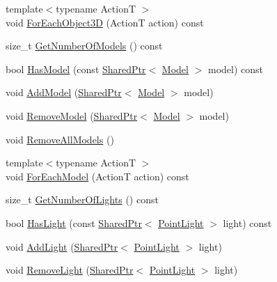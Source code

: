 \begin{DoxyCompactItemize}
\item 
{\footnotesize template$<$typename ActionT $>$ }\\void \hyperlink{classmage_1_1_world_aeaf99d59687121c072d483a98a726eff}{For\+Each\+Object3D} (ActionT action) const
\item 
size\+\_\+t \hyperlink{classmage_1_1_world_a6e04fdde74a2616746cdafd12537c4a7}{Get\+Number\+Of\+Models} () const
\item 
bool \hyperlink{classmage_1_1_world_a821d420241b2a94502b20e24595490df}{Has\+Model} (const \hyperlink{namespacemage_a1e01ae66713838a7a67d30e44c67703e}{Shared\+Ptr}$<$ \hyperlink{classmage_1_1_model}{Model} $>$ model) const
\item 
void \hyperlink{classmage_1_1_world_a4b7287a11ff316b029ec7727ed0d076d}{Add\+Model} (\hyperlink{namespacemage_a1e01ae66713838a7a67d30e44c67703e}{Shared\+Ptr}$<$ \hyperlink{classmage_1_1_model}{Model} $>$ model)
\item 
void \hyperlink{classmage_1_1_world_afad0c7024fcd304bb582bdc1d281c590}{Remove\+Model} (\hyperlink{namespacemage_a1e01ae66713838a7a67d30e44c67703e}{Shared\+Ptr}$<$ \hyperlink{classmage_1_1_model}{Model} $>$ model)
\item 
void \hyperlink{classmage_1_1_world_af3bae7b62192de9edda5e0567b73be93}{Remove\+All\+Models} ()
\item 
{\footnotesize template$<$typename ActionT $>$ }\\void \hyperlink{classmage_1_1_world_a8f9c130a358f6ce687d2948f477d4ef2}{For\+Each\+Model} (ActionT action) const
\item 
size\+\_\+t \hyperlink{classmage_1_1_world_a786420d8d8b97065ee591753b7f1541b}{Get\+Number\+Of\+Lights} () const
\item 
bool \hyperlink{classmage_1_1_world_ac76eb3df75c68ec28b7a9db9b0576171}{Has\+Light} (const \hyperlink{namespacemage_a1e01ae66713838a7a67d30e44c67703e}{Shared\+Ptr}$<$ \hyperlink{classmage_1_1_point_light}{Point\+Light} $>$ light) const
\item 
void \hyperlink{classmage_1_1_world_ab0c31d3113ea264fed8b8ef034047c91}{Add\+Light} (\hyperlink{namespacemage_a1e01ae66713838a7a67d30e44c67703e}{Shared\+Ptr}$<$ \hyperlink{classmage_1_1_point_light}{Point\+Light} $>$ light)
\item 
void \hyperlink{classmage_1_1_world_ab2bca0a737500b2d78b39e6cbafd61d0}{Remove\+Light} (\hyperlink{namespacemage_a1e01ae66713838a7a67d30e44c67703e}{Shared\+Ptr}$<$ \hyperlink{classmage_1_1_point_light}{Point\+Light} $>$ light)
\item 

\end{DoxyCompactItemize}
